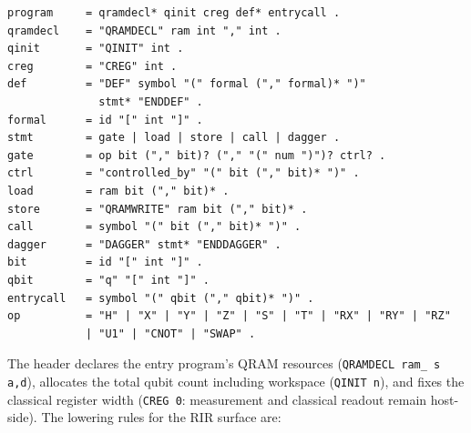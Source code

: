 \begin{lstlisting}[style=pyqir, caption={Grammar of the OriginIR-ext dialect as emitted by \texttt{export\_originir}.  \texttt{id} is \texttt{[A-Za-z\_][A-Za-z0-9\_]*}; \texttt{ram} names a declared QRAM resource; definition names consist of the module name and a content hash, making exports deterministic and diff-stable.}, label={lst:originir-grammar}]
program     = qramdecl* qinit creg def* entrycall .
qramdecl    = "QRAMDECL" ram int "," int .
qinit       = "QINIT" int .
creg        = "CREG" int .
def         = "DEF" symbol "(" formal ("," formal)* ")"
              stmt* "ENDDEF" .
formal      = id "[" int "]" .
stmt        = gate | load | store | call | dagger .
gate        = op bit ("," bit)? ("," "(" num ")")? ctrl? .
ctrl        = "controlled_by" "(" bit ("," bit)* ")" .
load        = ram bit ("," bit)* .
store       = "QRAMWRITE" ram bit ("," bit)* .
call        = symbol "(" bit ("," bit)* ")" .
dagger      = "DAGGER" stmt* "ENDDAGGER" .
bit         = id "[" int "]" .
qbit        = "q" "[" int "]" .
entrycall   = symbol "(" qbit ("," qbit)* ")" .
op          = "H" | "X" | "Y" | "Z" | "S" | "T" | "RX" | "RY" | "RZ"
            | "U1" | "CNOT" | "SWAP" .
\end{lstlisting}

The header declares the entry program's QRAM resources
(\texttt{QRAMDECL ram\_\ s a,d}), allocates the total qubit count including
workspace (\texttt{QINIT n}), and fixes the classical register width
(\texttt{CREG 0}: measurement and classical readout remain host-side).
The lowering rules for the RIR surface are:

